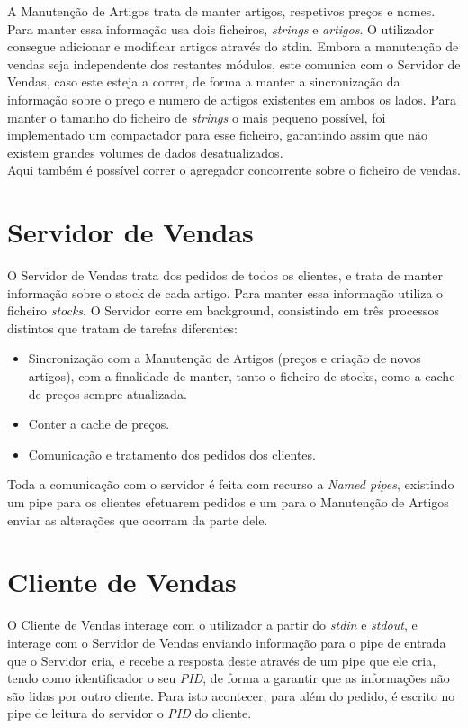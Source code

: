 \documentclass[a4paper]{report}
\begin{document}
A Manutenção de Artigos trata de manter artigos, respetivos preços
e nomes. Para manter essa informação usa dois ficheiros, \textit{strings}
e \textit{artigos}. O utilizador consegue adicionar e modificar artigos
através do stdin. Embora a manutenção de vendas seja independente dos 
restantes módulos, este comunica com o Servidor de Vendas, caso este esteja
a correr, de forma a manter a sincronização  da informação sobre o preço 
e numero de artigos existentes em ambos os lados. Para manter o tamanho
do ficheiro de \textit{strings} o mais pequeno possível, foi implementado
um compactador para esse ficheiro, garantindo assim que não existem grandes
volumes de dados desatualizados.\\
Aqui também é possível correr o agregador concorrente sobre o ficheiro 
de vendas.

\section{Servidor de Vendas}

O Servidor de Vendas trata dos pedidos de todos os clientes, e trata de 
manter informação sobre o stock de cada artigo. Para manter essa informação
utiliza o ficheiro \textit{stocks}. O Servidor corre em background, consistindo
em três processos distintos que tratam de tarefas diferentes:
\begin{itemize} 
    \item Sincronização com a Manutenção de Artigos
        (preços e criação de novos artigos), com a finalidade de manter,
        tanto o ficheiro de stocks, como a cache de preços sempre atualizada.
    \item Conter a cache de preços.
    \item Comunicação e tratamento dos pedidos dos clientes.
\end{itemize}
Toda a comunicação com o servidor é feita com recurso a \textit{Named pipes},
existindo um pipe para os clientes efetuarem pedidos e um para o Manutenção
de Artigos enviar as alterações que ocorram da parte dele.

\section{Cliente de Vendas}

O Cliente de Vendas interage com o utilizador a partir do \textit{stdin} e 
\textit{stdout}, e interage com o Servidor de Vendas enviando informação
para o pipe de entrada que o Servidor cria, e recebe a resposta deste
através de um pipe que ele cria, tendo como identificador o seu \textit{PID},
de forma a garantir que as informações não são lidas por outro cliente.
Para isto acontecer, para além do pedido, é escrito no pipe de leitura do
servidor o \textit{PID} do cliente.
\end{document}

